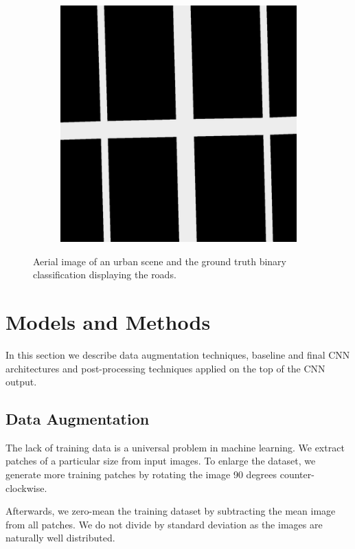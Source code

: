 \documentclass[10pt,conference,compsocconf]{IEEEtran}
\begin{document}
\begin{figure}
\begin{subfigure}{.2\textwidth}
		\includegraphics[width=1\textwidth]{figs/groundtruth1.png}
	\end{subfigure}
	\caption{Aerial image of an urban scene and the ground truth binary classification displaying the roads.}
	\label{fig:intro_example}
\end{figure}

\section{Models and Methods}
\label{sec:MM}
In this section we describe data augmentation techniques, baseline and final CNN architectures and post-processing techniques applied on the top of the CNN output.

\subsection{Data Augmentation}
\label{subsec:preprocessing}
The lack of training data is a universal problem in machine learning. We extract patches of a particular size from input images. To enlarge the dataset, we generate more training patches by rotating the image 90 degrees counter-clockwise.

Afterwards, we zero-mean the training dataset by subtracting the mean image from all patches. We do not divide by standard deviation as the images are naturally well distributed.
\end{document}
